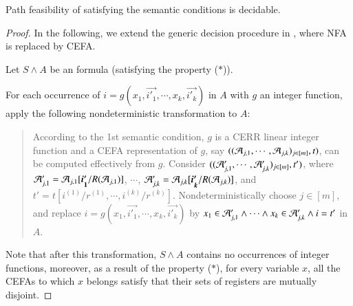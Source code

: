 {\begin{theorem}\label{thm-sl-int-dec}
Path feasibility of {\slint} satisfying the semantic conditions is decidable.
\end{theorem}

\begin{proof}
In the following, we extend the generic decision procedure in \cite{CHL+19}, where NFA is replaced by CEFA.

Let $S \wedge A$ be an {\slint} formula (satisfying the property ($*$)).

For each occurrence of $i = g(x_1, \vec{i'_1}, \cdots, x_k, \vec{i'_k})$ in $A$ with $g$ an integer function, apply the following nondeterministic transformation to $A$: 
\begin{quote}
According to the 1st semantic condition, $g$ is a CERR linear integer function and a CEFA representation of $g$, say $((\mathcal{A}_{j,1}, \cdots, \mathcal{A}_{j, k})_{j \in [m]}, t)$, can be computed effectively from $g$. Consider $((\mathcal{A}'_{j,1}, \cdots, \mathcal{A}'_{j, k})_{j \in [m]}, t')$, where $\NFA'_{j,1}=\NFA_{j,1}[\vec{i'_1}/R(\NFA_{j,1})]$, $\cdots$, $\NFA'_{j,k}=\NFA_{j,k}[\vec{i'_k}/R(\NFA_{j,k})]$, and $t' = t[i^{(1)}/r^{(1)}, \cdots, i^{(k)}/r^{(k)}]$.
Nondeterministically choose $j \in [m]$, and replace $i = g(x_1, \vec{i'_1}, \cdots, x_k, \vec{i'_k})$ by $x_1 \in \mathcal{A}'_{j,1} \wedge \cdots \wedge x_k \in \mathcal{A}'_{j,k} \wedge i = t'$ in $A$.
\end{quote}
Note that after this transformation, $S \wedge A$ contains no occurrences of integer functions, moreover, as a result of the property ($*$), for every variable $x$, all the CEFAs to which $x$ belongs satisfy that their sets of registers are  mutually disjoint.


\end{proof}}
